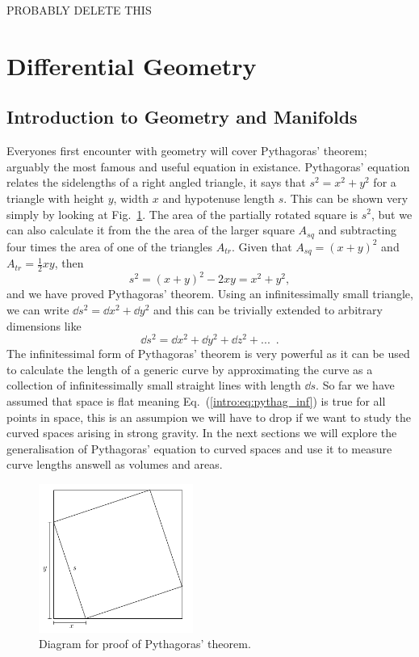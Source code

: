 PROBABLY DELETE THIS






\section{Differential Geometry}
\subsection{Introduction to Geometry and Manifolds}





Everyones first encounter with geometry will cover Pythagoras' theorem; arguably the most famous and useful equation in existance. Pythagoras' equation relates the sidelengths of a right angled triangle, it says that $s^2 = x^2 + y^2$ for a triangle with height $y$, width $x$ and hypotenuse length $s$. This can be shown very simply by looking at Fig.~\ref{intro:fig:pythag_proof}. The area of the partially rotated square is $s^2$, but we can also calculate it from the the area of the larger square $A_{sq}$ and subtracting four times the area of one of the triangles $A_{tr}$. Given that $A_{sq} = (x+y)^2$ and $A_{tr} = \frac{1}{2}xy$, then 
\begin{equation}
s^2 = (x+y)^2-2xy = x^2 + y^2,
\end{equation}
and we have proved Pythagoras' theorem. Using an infinitessimally small triangle, we can write $\dd s^2 = \dd x^2 + \dd y^2$ and this can be trivially extended to arbitrary dimensions like
\begin{equation}\label{intro:eq:pythag_inf}
\dd s^2 = \dd x^2 + \dd y^2 + \dd z^2 + ...\,\,\,.
\end{equation}
The infinitessimal form of Pythagoras' theorem is very powerful as it can be used to calculate the length of a generic curve by approximating the curve as a collection of infinitessimally small straight lines with length $\dd s$. So far we have assumed that space is flat meaning Eq.~(\ref{intro:eq:pythag_inf}) is true for all points in space, this is an assumpion we will have to drop if we want to study the curved spaces arising in strong gravity. In the next sections we will explore the generalisation of Pythagoras' equation to curved spaces and use it to measure curve lengths answell as volumes and areas.

\begin{figure}[h]
\centering
    \includegraphics[width=0.45\textwidth]{pics/pythag_proof2.png}
    \caption{Diagram for proof of Pythagoras' theorem.}
    \label{intro:fig:pythag_proof}
\end{figure}


